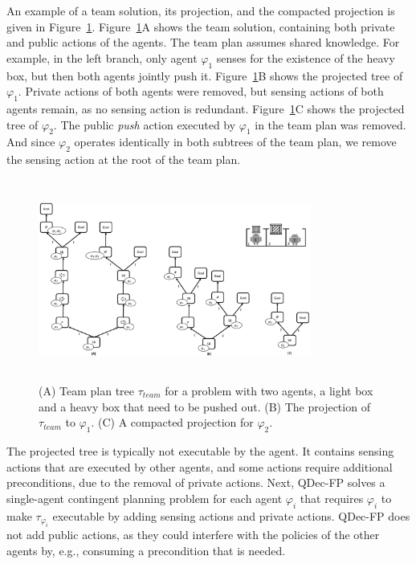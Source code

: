 \documentclass[letterpaper]{article} %
\theoremstyle{definition}
\begin{document}
An example of a team solution, its projection, and the compacted projection is given in Figure~\ref{fig:projected}.  Figure~\ref{fig:projected}A shows the team solution, containing both private and public actions of the %
agents. The team plan assumes shared knowledge.
For example,
in the left branch, only agent $\varphi_1$ senses for the existence of the heavy box, but then both agents jointly push it. Figure~\ref{fig:projected}B shows the projected tree of $\varphi_1$. Private actions of both agents were removed, but sensing actions of both agents remain,
as no sensing action is redundant. Figure~\ref{fig:projected}C shows the projected tree of $\varphi_2$. The public {\em push} action executed by $\varphi_1$ in the team plan was removed. And since $\varphi_2$ operates identically in both subtrees of the team plan, we remove the sensing action at the root of the team plan.

\begin{figure}[h!]
\centering
\includegraphics[width=0.8\textwidth, height=2.6in]{main-projection.pdf}
\caption{(A) Team plan tree $\tau_{team}$ for a problem with two agents, a light box and a heavy box that need to be pushed out.
(B) The projection of $\tau_{team}$ to $\varphi_1$.
(C) A compacted projection for $\varphi_2$.
}
\label{fig:projected}
\end{figure}

The projected tree is typically not executable by the agent. It contains sensing actions that are executed by other agents, and some actions require additional preconditions, due to the removal of private actions.
Next, QDec-FP solves a single-agent contingent planning problem for each agent $\varphi_i$ that requires $\varphi_i$ to make $\tau_{\varphi_i}$ executable by adding sensing actions and private actions.
QDec-FP does not add public actions, as they could interfere with the policies of the other agents by, e.g., consuming a precondition that is needed.
\end{document}
